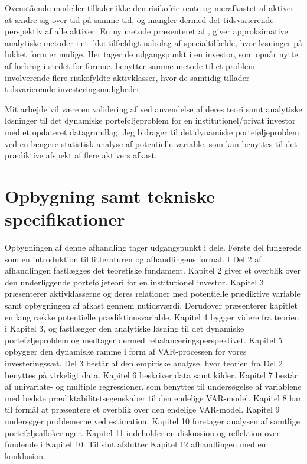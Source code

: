 \documentclass[
  a4paper,
  oneside]{memoir}
\begin{document}
Ovenstående modeller tillader ikke den risikofrie rente og merafkastet af aktiver at ændre sig over tid på samme tid, og mangler dermed det tidsvarierende perspektiv af alle aktiver. En ny metode præsenteret af \citep{CampVic1999, CampVic2001, CampVic2003}, giver approksimative analytiske metoder i et ikke-tilfældigt nabolag af specialtilfælde, hvor løsninger på lukket form er mulige. Her tager de udgangspunkt i en investor, som opnår nytte af forbrug i stedet for formue. \citep{CampVicCha2003} benytter samme metode til et problem involverende flere risikofyldte aktivklasser, hvor de samtidig tillader tidsvarierende investeringsmuligheder.

Mit arbejde vil være en validering af \citep{JurVic2011} ved anvendelse af deres teori samt analytiske løsninger til det dynamiske porteføljeproblem for en institutionel/privat investor med et opdateret datagrundlag. Jeg bidrager til det dynamiske porteføljeproblem ved en længere statistisk analyse af potentielle variable, som kan benyttes til det prædiktive afspekt af flere aktivers afkast.

\hypertarget{opbygning-samt-tekniske-specifikationer}{%
\section{Opbygning samt tekniske specifikationer}\label{opbygning-samt-tekniske-specifikationer}}

Opbygningen af denne afhandling tager udgangspunkt i dele. Første del fungerede som en introduktion til litteraturen og afhandlingens formål. I Del 2 af afhandlingen fastlægges det teoretiske fundament. Kapitel 2 giver et overblik over den underliggende porteføljeteori for en institutionel investor. Kapitel 3 præsenterer aktivklasserne og deres relationer med potentielle prædiktive variable samt opbygningen af afkast gennem nutidsværdi. Derudover præsenterer kapitlet en lang række potentielle prædiktionsvariable. Kapitel 4 bygger videre fra teorien i Kapitel 3, og fastlægger den analytiske løsning til det dynamiske porteføljeproblem og medtager dermed rebalanceringsperspektivet. Kapitel 5 opbygger den dynamiske ramme i form af VAR-processen for vores investeringssæt. Del 3 består af den empiriske analyse, hvor teorien fra Del 2 benyttes på virkeligt data. Kapitel 6 beskriver data samt kilder. Kapitel 7 består af univariate- og multiple regressioner, som benyttes til undersøgelse af variablene med bedste prædiktabilitetsegenskaber til den endelige VAR-model. Kapitel 8 har til formål at præsentere et overblik over den endelige VAR-model. Kapitel 9 undersøger problemerne ved estimation. Kapitel 10 foretager analysen af samtlige porteføljeallokeringer. Kapitel 11 indeholder en diskussion og reflektion over fundende i Kapitel 10. Til slut afslutter Kapitel 12 afhandlingen med en konklusion.
\end{document}
